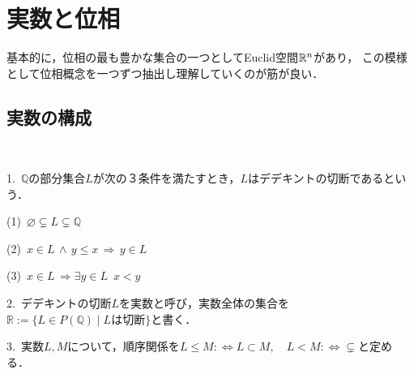 \documentclass[uplatex, 12pt, dvipdfmx]{jsreport}
\begin{document}
\chapter{実数と位相}

\begin{screen}
    基本的に，位相の最も豊かな集合の一つとしてEuclid空間$\mathbb{R}^n$があり，
    この模様として位相概念を一つずつ抽出し理解していくのが筋が良い．
\end{screen}

\section{実数の構成}

\begin{definition}\rm{}　

    1.\, $\mathbb{Q}$の部分集合$L$が次の３条件を満たすとき，$L$はデデキントの切断であるという．

    (1)\, $\varnothing\subsetneq L\subsetneq\mathbb{Q}$

    (2)\, $x\in L \,\wedge\, y\le x \,\Rightarrow\, y\in L$

    (3)\, $x\in L \,\Rightarrow \exists y\in L \,\,\, x<y$

    2.\, デデキントの切断$L$を実数と呼び，実数全体の集合を$\mathbb{R}:=\{ L\in P(\mathbb{Q})\mid Lは切断 \}$と書く．


    3.\, 実数$L,M$について，順序関係を$L\le M :\Leftrightarrow L\subset M,\hspace{1em} L<M :\Leftrightarrow \subsetneq$と定める．
\end{definition}
\end{document}
